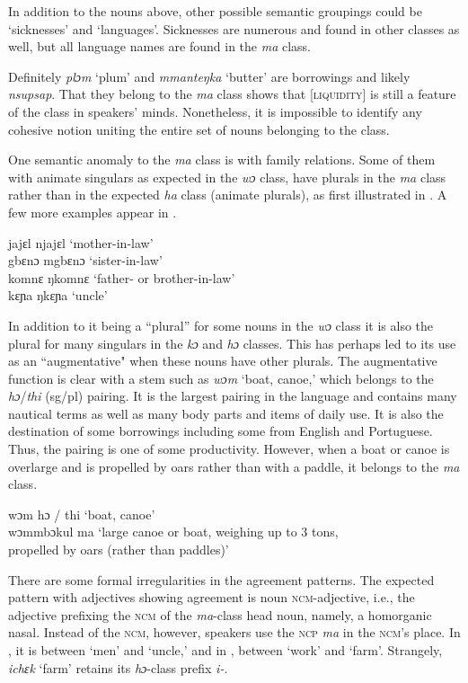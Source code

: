 In addition to the nouns above, other possible semantic groupings could be ‘sicknesses' and ‘languages'. Sicknesses are numerous and found in other classes as well, but all language names are found in the \textit{ma} class.

Definitely \textit{plɔm} ‘plum' and \textit{mmanteŋka} ‘butter' are borrowings and likely \textit{nsupsap}. That they belong to the \textit{ma} class shows that [\textsc{liquidity}] is still a feature of the class in speakers' minds. Nonetheless, it is impossible to identify any cohesive notion uniting the entire set of nouns belonging to the class.

One semantic anomaly to the \textit{ma} class is with family relations. Some of them with animate singulars as expected in the \textit{wɔ} class, have plurals in the \textit{ma} class rather than in the expected \textit{ha} class (animate plurals), as first illustrated in . A few more examples appear in .

\ea%
    \label{ex:148} jajɛl \tab njajɛl \tab ‘mother-in-law'\\
gbɛnɔ \tab mgbɛnɔ \tab ‘sister-in-law'\\ 
komnɛ \tab ŋkomnɛ \tab ‘father- or brother-in-law'\\
kɛɲa \tab ŋkɛɲa \tab ‘uncle'\\
\z

In addition to it being a “plural” for some nouns in the \textit{wɔ} class it is also the plural for many singulars in the \textit{kɔ} and \textit{hɔ} classes. This has perhaps led to its use as an “augmentative" when these nouns have other plurals. The augmentative function is clear with a stem such as \textit{wɔm} ‘boat, canoe,' which belongs to the \textit{hɔ}/\textit{thi} (sg/pl) pairing. It is the largest pairing in the language and contains many nautical terms as well as many body parts and items of daily use. It is also the destination of some borrowings including some from English and Portuguese.  Thus, the pairing is one of some productivity. However, when a boat or canoe is overlarge and is propelled by oars rather than with a paddle, it belongs to the \textit{ma} class.

\ea%
    \label{ex:149}
    wɔm \tab hɔ / thi \tab ‘boat, canoe'\\
    wɔmmbɔkul ma \tab ‘large canoe or boat, weighing up to 3 tons,\\
    \tab\tab propelled by oars (rather than paddles)'
\z

There are some formal irregularities in the agreement patterns. The expected pattern with adjectives showing agreement is noun \textsc{ncm}{}-adjective, i.e., the adjective prefixing the \textsc{ncm} of the \textit{ma}{}-class head noun, namely, a homorganic nasal. Instead of the \textsc{ncm}, however, speakers use the \textsc{ncp} \textit{ma} in the \textsc{ncm}'s place. In , it is between ‘men' and ‘uncle,' and in , between ‘work' and ‘farm'. Strangely, \textit{ichɛk} ‘farm' retains its \textit{hɔ}{}-class prefix \textit{i-}.

